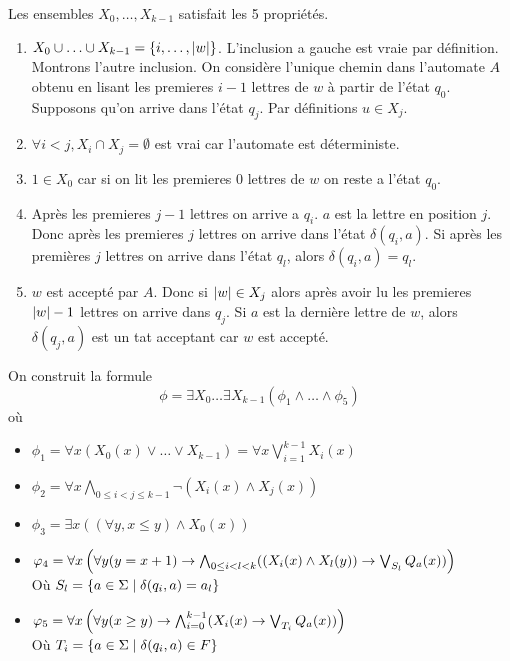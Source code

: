\begin{proofI}
\begin{itemize}
		      Les ensembles $X_0, \ldots, X_{k-1}$ satisfait les 5 propriétés.
		      \begin{enumerate}
			      \item $X_0 \cup \ldots \cup X_{k-1} = \left\{i,\ldots,\left|w\right|\right\}$. L'inclusion a gauche est vraie par définition. Montrons l'autre inclusion.
			            On considère l'unique chemin dans l'automate $A$ obtenu en lisant les premieres $i-1$ lettres de $w$ à partir de l'état $q_0$.
			            Supposons qu'on arrive dans l'état $q_j$. Par définitions $u \in X_j$.
			      \item $\forall i < j, X_i \cap X_j = \emptyset$ est vrai car l'automate est déterministe.
			      \item $1 \in X_0$ car si on lit les premieres $0$ lettres de $w$ on reste a l'état $q_0$.
			      \item Après les premieres $j-1$ lettres on arrive a $q_i$. $a$ est la lettre en position $j$. Donc après les
			            premieres $j$ lettres on arrive dans l'état $\delta (q_i, a)$. Si après les premières $j$ lettres on arrive dans l'état $q_l$, alors
			            $\delta (q_i, a) = q_l$.
			      \item $w$ est accepté par $A$. Donc si $\left|w\right| \in X_j$ alors après avoir lu les premieres $\left|w\right| - 1$ lettres on arrive dans $q_j$.
			            Si $a$ est la dernière lettre de $w$, alors $\delta (q_j,a)$ est un tat acceptant car $w$ est accepté.
		      \end{enumerate}
		      On construit la formule
		      $$ \phi = \exists X_0 \ldots \exists X_{k-1} (\phi_1 \land \ldots \land \phi_5)$$
		      où
		      \begin{itemize}
			      \item $\phi_1 = \forall x (X_0(x) \lor \ldots \lor X_{k-1}) = \forall x \bigvee_{i=1}^{k-1} X_i(x)$
			      \item $\phi_2 = \forall x \bigwedge_{0\leq i < j \leq k-1}\lnot (X_i(x) \land X_j(x))$
			      \item $\phi_3 = \exists x \left((\forall y, x \leq y) \land X_0(x) \right)$
			      \item $\varphi_4 = \forall x \left( \forall y (y = x + 1)  \rightarrow \bigwedge_{0\leq i < l < k} ( (X_i (x) \land X_l(y) )\rightarrow \bigvee_{S_l} Q_a(x))\right)$\\
			            Où $S_l = \left\{a \in \Sigma \mid \delta (q_i,a) = a_l\right\}$
			      \item $\varphi_5 = \forall x \left( \forall y (x \geq y)  \rightarrow \bigwedge_{i = 0}^{k-1} ( X_i(x) \rightarrow \bigvee_{T_i} Q_a(x))\right)$\\
			            Où $T_i = \left\{a \in \Sigma \mid \delta (q_i,a) \in F\right\}$


\end{itemize}
\end{itemize}
\end{proofI}

